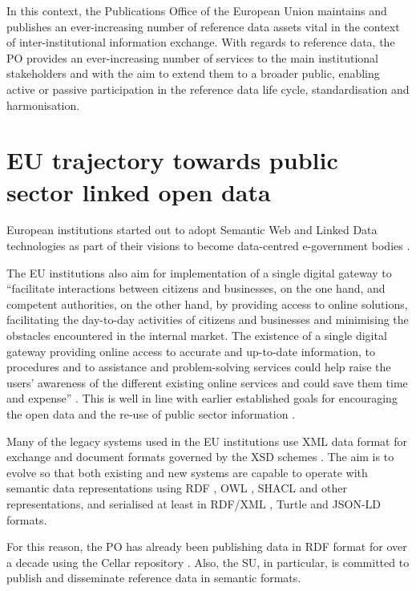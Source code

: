 	In this context, the Publications Office of the European Union maintains and publishes an ever-increasing number of reference data assets vital in the context of inter-institutional information exchange. With regards to reference data, the PO provides an ever-increasing number of services to the main institutional stakeholders and with the aim to extend them to a broader public, enabling active or passive participation in the reference data life cycle, standardisation and harmonisation.

	\section{EU trajectory towards public sector linked open data}
	
	European institutions started out to adopt Semantic Web and Linked Data technologies as part of their visions to become data-centred e-government bodies \citep{decission-456/2005/EC,decission-2015/2240}. 
	
	The EU institutions also aim for implementation of a single digital gateway to ``facilitate interactions between citizens and businesses, on the one hand, and competent authorities, on the other hand, by providing access to online solutions, facilitating the day-to-day activities of citizens and businesses and minimising the obstacles encountered in the internal market. The existence of a single digital gateway providing online access to accurate and up-to-date information, to procedures and to assistance and problem-solving services could help raise the users' awareness of the different existing online services and could save them time and expense'' \citep{directive-2018/1724}. This is well in line with earlier established goals for encouraging the open data and the re-use of public sector information \citep{directive-2013/37/EU,directive-2019/1024}.

	Many of the legacy systems used in the EU institutions use XML data format for exchange and document formats governed by the XSD schemes \citep{xsd1.1-spec}. The aim is to evolve so that both existing and new systems are capable to operate with semantic data representations using RDF \citep{rdf11}, OWL \citep{owl2.0,owl2}, SHACL \citep{shacl-spec} and other representations, and serialised at least in RDF/XML \citep{rdf-xml-Beckett:04:RSS,rdf-xml-Schreiber:14:RXS}, Turtle \citep{turtle-Carothers:14:RT} and JSON-LD \citep{spornyjson,sporny2014json} formats.
	
	For this reason, the PO has already been publishing data in RDF format for over a decade using the Cellar repository \citep{cdm-francesconi2015ontology}. Also, the SU, in particular, is committed to publish and disseminate reference data in semantic formats. 
	
